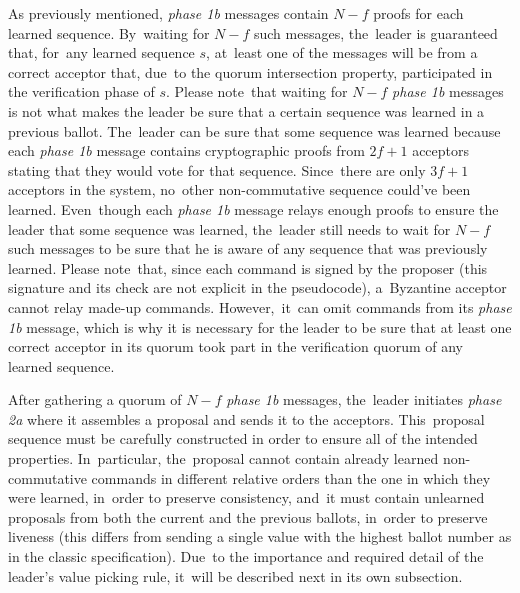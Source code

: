 \documentclass[algorithms,article,accept,moreauthors,pdftex,10pt,a4paper]{Definitions/mdpi}
\begin{document}
As previously mentioned, \textit{phase 1b} messages contain $N-f$ proofs for each learned sequence. By~waiting for $N-f$ such messages, the~leader is guaranteed that, for~any learned sequence $s$, at~least one of the messages will be from a correct acceptor that, due~to the quorum intersection property, participated in the verification phase of $s$. Please note~that waiting for $N-f$ \textit{phase 1b} messages is not what makes the leader be sure that a certain sequence was learned in a previous ballot. The~leader can be sure that some sequence was learned because each \textit{phase 1b} message contains cryptographic proofs from $2f+1$ acceptors stating that they would vote for that sequence. Since~there are only $3f+1$ acceptors in the system, no~other non-commutative sequence could've been learned. Even~though each \textit{phase 1b} message relays enough proofs to ensure the leader that some sequence was learned, the~leader still needs to wait for $N-f$ such messages to be sure that he is aware of any sequence that was previously learned. Please note~that, since each command is signed by the proposer (this signature and its check are not explicit in the pseudocode), a~Byzantine acceptor cannot relay made-up commands. However,~it~can omit commands from its \textit{phase 1b} message, which is why it is necessary for the leader to be sure that at least one correct acceptor in its quorum took part in the verification quorum of any learned sequence. \par
After gathering a quorum of $N-f$ \textit{phase 1b} messages, the~leader initiates \textit{phase 2a} where it assembles a proposal and sends it to the acceptors. This~proposal sequence must be carefully constructed in order to ensure all of the intended properties. In~particular, the~proposal cannot contain already learned non-commutative commands in different relative orders than the one in which they were learned, in~order to preserve consistency, and~it must contain unlearned proposals from both the current and the previous ballots, in~order to preserve liveness (this differs from sending a single value with the highest ballot number as in the classic specification). Due~to the importance and required detail of the leader's value picking rule, it~will be described next in its own subsection. \par
\end{document}
